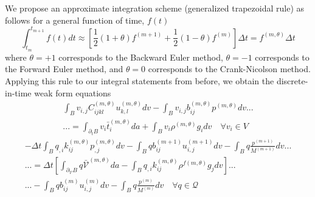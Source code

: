 \documentclass[11pt]{article} %
\begin{document}
We propose an approximate integration scheme (generalized trapezoidal rule) as follows for a general function of time, $f(t)$
\begin{equation}
	\int_{t_m}^{t_{m+1}} f(t) dt \approx \left[ \frac{1}{2} (1 + \theta) f^{(m+1)} + \frac{1}{2} (1 - \theta) f^{(m)} \right] \Delta t = f^{(m,\theta)} \Delta t
\end{equation}
where $\theta = +1$ corresponds to the Backward Euler method, $\theta = -1$ corresponds to the Forward Euler method, and $\theta = 0$ corresponds to the Crank-Nicolson method. Applying this rule to our integral statements from before, we obtain the discrete-in-time weak form equations
\begin{eqnarray}
	\int_B v_{i,j} C_{ijkl}^{(m,\theta)} u_{k,l}^{(m,\theta)} dv - \int_B v_{i,j} b_{ij}^{(m,\theta)} p^{(m,\theta)} dv ... \nonumber \\
	... = \int_{\partial_t B} v_i \bar{t}_i^{(m,\theta)} da + \int_B v_i \rho^{(m,\theta)} g_i dv \quad \forall v_i \in V
\end{eqnarray}
\begin{eqnarray}
	- \Delta t \int_B q_{,i} k_{ij}^{(m,\theta)} p_{,j}^{(m,\theta)} dv - \int_B q b_{ij}^{(m+1)} u_{i,j}^{(m+1)} dv - \int_B q \frac{p^{(m+1)}}{M^{(m+1)}} dv ... \nonumber \\
	... = \Delta t \left[ \int_{\partial_{\mathcal{V}} B} q \bar{\mathcal{V}}^{(m,\theta)} da - \int_B q_{,i} k_{ij}^{(m,\theta)} \rho^{f (m,\theta)} g_j dv \right] ... \nonumber \\
	... - \int_B q b_{ij}^{(m)} u_{i,j}^{(m)} dv - \int_B q \frac{p^{(m)}}{M^{(m)}} dv \quad \forall q \in \mathcal{Q}
\end{eqnarray}
\end{document}
